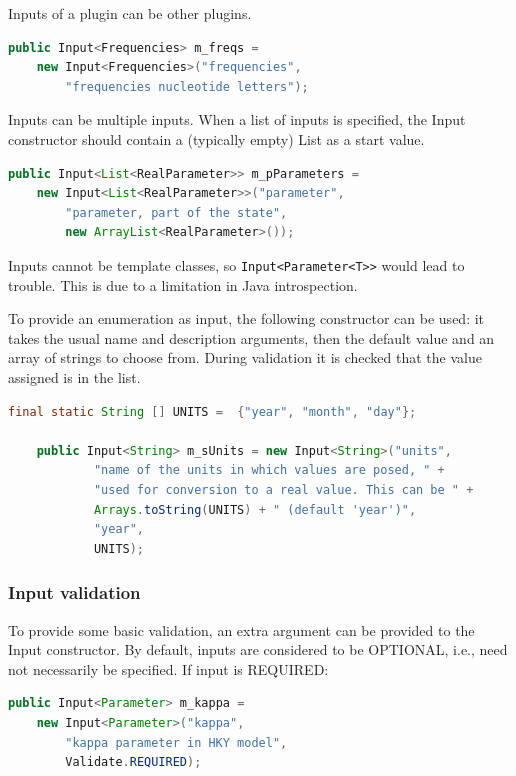 \documentclass{article}
\begin{document}
Inputs of a plugin can be other plugins.

{\color{blue}\begin{lstlisting}[language=java]
public Input<Frequencies> m_freqs = 
    new Input<Frequencies>("frequencies", 
        "frequencies nucleotide letters");
\end{lstlisting}}

Inputs can be multiple inputs. When a list of inputs is specified,
the Input constructor should contain a (typically empty) List as a start value.

{\color{blue}\begin{lstlisting}[language=java]
public Input<List<RealParameter>> m_pParameters = 
    new Input<List<RealParameter>>("parameter", 
        "parameter, part of the state",
        new ArrayList<RealParameter>());
\end{lstlisting}}

Inputs cannot be template classes, so {\tt Input<Parameter<T>>} would lead to
trouble. This is due to a limitation in Java introspection.

To provide an enumeration as input, the following constructor can be
used: it takes the usual name and description arguments, then the default
value and an array of strings to choose from. During validation it is 
checked that the value assigned is in the list.

{\color{blue}\begin{lstlisting}[language=java]
	final static String [] UNITS =  {"year", "month", "day"};
	
	public Input<String> m_sUnits = new Input<String>("units", 
            "name of the units in which values are posed, " +
			"used for conversion to a real value. This can be " + 
            Arrays.toString(UNITS) + " (default 'year')", 
            "year", 
            UNITS);
\end{lstlisting}}


\subsubsection{Input validation}

To provide some basic validation, an extra argument can be provided to the Input constructor.
By default, inputs are considered to be OPTIONAL, i.e., need not necessarily be specified.
If input is REQUIRED:

{\color{blue}\begin{lstlisting}[language=java]
public Input<Parameter> m_kappa = 
    new Input<Parameter>("kappa", 
        "kappa parameter in HKY model",
        Validate.REQUIRED);
\end{lstlisting}}
\end{document}
